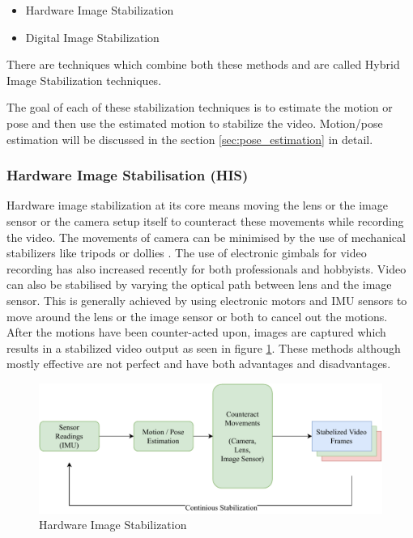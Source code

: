 \begin{itemize}
\item Hardware Image Stabilization
\item Digital Image Stabilization  
\end{itemize}
There are techniques which combine both these methods and are called Hybrid Image Stabilization techniques.

The goal of each of these stabilization techniques is to estimate the motion or pose and then use the estimated motion to stabilize the video. Motion/pose estimation will be discussed in the section \ref{sec:pose_estimation} in detail.

\subsubsection{Hardware Image Stabilisation (HIS)}
Hardware image stabilization at its core means moving the lens or the image sensor or the camera setup itself to counteract these movements while recording the video. The movements of camera can be minimised by the use of mechanical stabilizers like tripods or dollies \citep{5995525}. The use of electronic gimbals for video recording has also increased recently for both professionals and hobbyists. Video can also be stabilised by varying the optical path between lens and the image sensor. This is generally achieved by using electronic motors and IMU sensors to move around the lens or the image sensor or both to cancel out the motions. After the motions have been counter-acted upon, images are captured which results in a stabilized video output as seen in figure \ref{fig:his}. These methods although mostly effective are not perfect and have both advantages and disadvantages.

\begin{figure}[H]
\centering
\includegraphics[scale=0.6]{images/fig_chapter2/2_1_his.pdf}
\caption{Hardware Image Stabilization}
\label{fig:his}
\end{figure}

